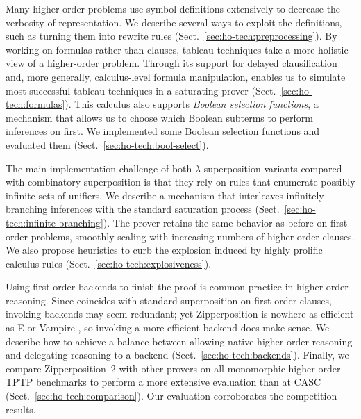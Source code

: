 Many higher-order problems use symbol definitions extensively to decrease the
verbosity of representation. We describe several ways to exploit the
definitions,
such as turning them into rewrite rules (Sect.~\ref{sec:ho-tech:preprocessing}).
%
By working on formulas rather than clauses, tableau techniques take a more
holistic view of a higher-order problem.
Through its support for delayed clausification and, more generally,
calculus-level formula manipulation, \osup{} enables us to
simulate most successful tableau techniques in a saturating prover
(Sect.~\ref{sec:ho-tech:formulas}). This calculus also supports \emph{Boolean selection
functions}, a mechanism that allows us to choose which Boolean subterms
to perform inferences on first.
We implemented some Boolean selection functions and
evaluated them (Sect.~\ref{sec:ho-tech:bool-select}).

The main implementation challenge of both $\lambda$-superposition variants compared with
combinatory superposition is that they rely on rules that enumerate possibly
infinite sets of unifiers. We describe a mechanism that interleaves infinitely
branching inferences with the standard saturation process
(Sect.~\ref{sec:ho-tech:infinite-branching}). The prover retains the same
behavior as before on first-order problems, smoothly scaling with increasing
numbers of higher-order clauses.
%
We also propose heuristics to curb the explosion induced by highly
prolific calculus rules (Sect.~\ref{sec:ho-tech:explosiveness}).

Using first-order backends to finish the proof is common practice in
higher-order reasoning. Since \osup{} coincides with standard
superposition on first-order clauses, invoking backends may
seem redundant; yet Zipperposition is nowhere as efficient as E
\cite{scv-19-e23} or Vampire \cite{lkav-13-vampire}, so invoking a more
efficient backend does make sense. We describe how to achieve a balance
between allowing native higher-order reasoning and
delegating reasoning to a backend (Sect.~\ref{sec:ho-tech:backends}).
%
Finally, we compare Zipperposition~2 with other provers on all monomorphic
higher-order TPTP benchmarks \cite{gs-17-tptp} to perform a more extensive
evaluation than at CASC (Sect.~\ref{sec:ho-tech:comparison}). Our evaluation
corroborates the competition results.

